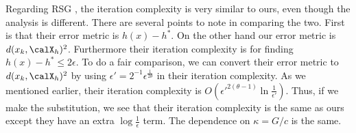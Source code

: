 \documentclass[smallextended]{svjour3}
\begin{document}
  
Regarding RSG \cite{yang2015rsg}, the iteration complexity is very similar to ours, even though the analysis is different. There are several points to note in comparing the two. First is that their error metric is $h(x)-h^*$. 
 On the other hand our error metric is $d(x_k,\calX_h)^2$. Furthermore their iteration complexity is for finding $h(x)-h^*\leq 2\epsilon$. To do a fair comparison, we can convert their error metric to $d(x_k,\calX_h)^2$ by using $\epsilon'=2^{-1}\epsilon^{\frac{1}{2\theta}}$ in their iteration complexity. As we mentioned earlier, their iteration complexity is $O(\epsilon'^{2(\theta-1)}\ln\frac{1}{\epsilon'})$. Thus, if we make the substitution, we see that their iteration complexity is the same as ours except they have an extra $\log\frac{1}{\epsilon}$ term.
 The dependence on $\kappa = G/c$ is the same. 
 
\end{document}
